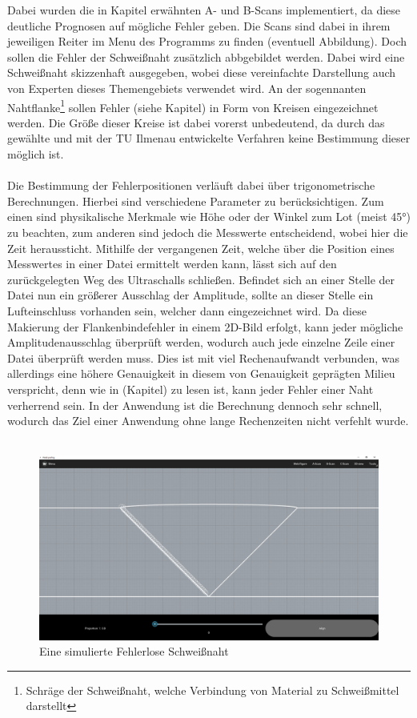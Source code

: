 \documentclass[a4paper,10pt,ngerman]{scrartcl}
\begin{document}
Dabei wurden die in Kapitel erwähnten A- und B-Scans implementiert, da diese deutliche Prognosen auf mögliche Fehler geben. 
Die Scans sind dabei in ihrem jeweiligen Reiter im Menu des Programms zu finden (eventuell Abbildung). 
Doch sollen die Fehler der Schweißnaht zusätzlich abbgebildet werden. Dabei wird eine Schweißnaht skizzenhaft
ausgegeben, wobei diese vereinfachte Darstellung auch von Experten dieses Themengebiets verwendet wird. 
An der sogennanten Nahtflanke\footnote{Schräge der Schweißnaht, welche Verbindung von Material zu Schweißmittel darstellt} sollen Fehler (siehe Kapitel) 
in Form von Kreisen eingezeichnet werden. Die Größe dieser Kreise ist dabei vorerst unbedeutend, da durch das gewählte und mit der 
TU Ilmenau entwickelte Verfahren keine Bestimmung dieser möglich ist. \\ \\
Die Bestimmung der Fehlerpositionen verläuft dabei über trigonometrische Berechnungen. Hierbei sind verschiedene Parameter zu berücksichtigen. 
Zum einen sind physikalische Merkmale wie Höhe oder der Winkel zum Lot (meist 45°) zu beachten, zum anderen 
sind jedoch die Messwerte entscheidend, wobei hier die Zeit heraussticht. Mithilfe der vergangenen Zeit, welche über die Position eines Messwertes in einer 
Datei ermittelt werden kann, lässt sich auf den zurückgelegten Weg des Ultraschalls schließen. Befindet sich an einer Stelle 
der Datei nun ein größerer Ausschlag der Amplitude, sollte an dieser Stelle ein Lufteinschluss vorhanden sein, 
welcher dann eingezeichnet wird. Da diese Makierung der Flankenbindefehler in einem 2D-Bild erfolgt, 
kann jeder mögliche Amplitudenausschlag überprüft werden, wodurch auch jede einzelne Zeile einer Datei überprüft werden muss. 
Dies ist mit viel Rechenaufwandt verbunden, was allerdings eine höhere Genauigkeit in diesem von Genauigkeit geprägten Milieu verspricht, 
denn wie in (Kapitel) zu lesen ist, kann jeder Fehler einer Naht verherrend sein. In der Anwendung ist die Berechnung dennoch 
sehr schnell, wodurch das Ziel einer Anwendung ohne lange Rechenzeiten nicht verfehlt wurde. \\ \\
\begin{figure}[H]
  \centering
  \includegraphics[width=\textwidth]{img/naht_fehlerlos.png}
  \caption{Eine simulierte Fehlerlose Schweißnaht}
\end{figure}
 
\end{document}

